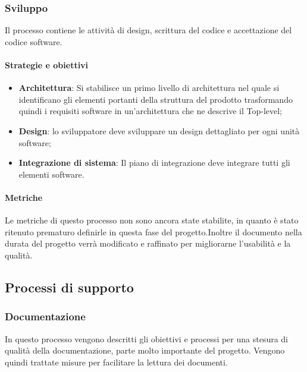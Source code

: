     \newpage  
    
    \subsubsection{Sviluppo}
    Il processo contiene le attività di design, scrittura del codice e accettazione del codice software.
    
        \paragraph{Strategie e obiettivi}
        \begin{itemize}
            \item \textbf{Architettura}: Si stabilisce un primo livello di architettura nel quale si identificano gli elementi portanti della struttura del prodotto trasformando quindi i requisiti software in un'architettura che ne descrive il Top-level;
            \item \textbf{Design}: lo sviluppatore deve sviluppare un design dettagliato per ogni unità software;
            \item \textbf{Integrazione di sistema}: Il piano di integrazione deve integrare tutti gli elementi software.
        \end{itemize}
        
        \paragraph{Metriche}
        Le metriche di questo processo non sono ancora state stabilite, in quanto è stato ritenuto prematuro definirle in questa fase del progetto.Inoltre il documento nella durata del progetto verrà modificato e raffinato per migliorarne l'usabilità e la qualità.
        
        
        
        \subsection{Processi di supporto}
            \subsubsection{Documentazione}
            In questo processo vengono descritti gli obiettivi e processi per una stesura di qualità della documentazione, parte molto importante del progetto. Vengono quindi trattate misure per facilitare la lettura dei documenti.
            
